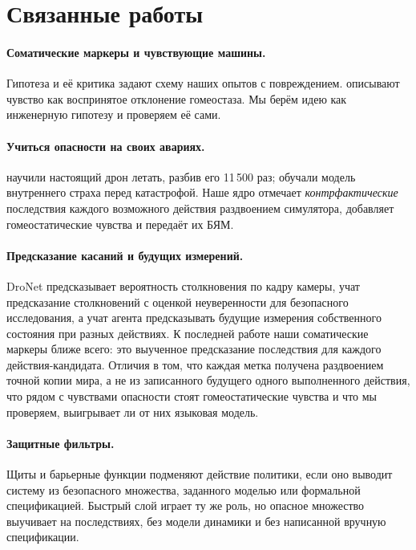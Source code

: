 \documentclass[10pt]{article}
\begin{document}
\section{Связанные работы}
\paragraph{Соматические маркеры и чувствующие машины.} Гипотеза \citep{damasio1994,bechara1997} и её критика \citep{dunn2006}
задают схему наших опытов с повреждением. \citet{man2019} описывают чувство как воспринятое отклонение гомеостаза. Мы берём идею
как инженерную гипотезу и проверяем её сами.
\paragraph{Учиться опасности на своих авариях.} \citet{gandhi2017} научили настоящий дрон летать, разбив его 11\,500 раз;
\citet{lipton2016} обучали модель внутреннего страха перед катастрофой. Наше ядро отмечает \emph{контрфактические} последствия
каждого возможного действия раздвоением симулятора, добавляет гомеостатические чувства и передаёт их БЯМ.
\paragraph{Предсказание касаний и будущих измерений.} DroNet \citep{loquercio2018dronet} предсказывает вероятность столкновения
по кадру камеры, \citet{kahn2017uncertainty} учат предсказание столкновений с оценкой неуверенности для безопасного исследования,
а \citet{dosovitskiy2017future} учат агента предсказывать будущие измерения собственного состояния при разных действиях. К
последней работе наши соматические маркеры ближе всего: это выученное предсказание последствия для каждого действия-кандидата.
Отличия в том, что каждая метка получена раздвоением точной копии мира, а не из записанного будущего одного выполненного действия,
что рядом с чувствами опасности стоят гомеостатические чувства и что мы проверяем, выигрывает ли от них языковая модель.
\paragraph{Защитные фильтры.} Щиты \citep{alshiekh2018shield} и барьерные функции \citep{ames2019cbf} подменяют действие
политики, если оно выводит систему из безопасного множества, заданного моделью или формальной спецификацией. Быстрый слой играет
ту же роль, но опасное множество выучивает на последствиях, без модели динамики и без написанной вручную спецификации.
\end{document}
